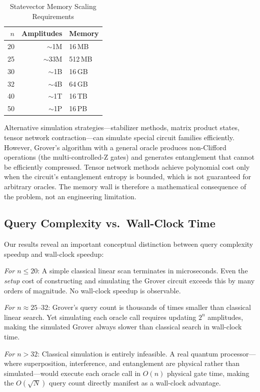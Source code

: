 \documentclass[sigconf, authorversion, nonacm]{acmart}
\begin{document}
\begin{table}[htbp]
\centering
\caption{Statevector Memory Scaling Requirements}
\label{tab:memory_wall}
\begin{tabular}{rrl}
\toprule
$n$ & Amplitudes & Memory \\
\midrule
20 & $\sim$1M  & 16\,MB \\
25 & $\sim$33M & 512\,MB \\
30 & $\sim$1B  & 16\,GB \\
32 & $\sim$4B  & 64\,GB \\
40 & $\sim$1T  & 16\,TB \\
50 & $\sim$1P  & 16\,PB \\
\bottomrule
\end{tabular}
\end{table}

Alternative simulation strategies---stabilizer methods, matrix product states, tensor network contraction---can simulate special circuit families efficiently. However, Grover's algorithm with a general oracle produces non-Clifford operations (the multi-controlled-Z gates) and generates entanglement that cannot be efficiently compressed. Tensor network methods achieve polynomial cost only when the circuit's entanglement entropy is bounded, which is not guaranteed for arbitrary oracles. The memory wall is therefore a mathematical consequence of the problem, not an engineering limitation.

\subsection{Query Complexity vs.\ Wall-Clock Time}

Our results reveal an important conceptual distinction between query complexity speedup and wall-clock speedup:

\textit{For $n \leq 20$}: A simple classical linear scan terminates in microseconds. Even the \emph{setup} cost of constructing and simulating the Grover circuit exceeds this by many orders of magnitude. No wall-clock speedup is observable.

\textit{For $n \approx 25$--$32$}: Grover's query count is thousands of times smaller than classical linear search. Yet simulating each oracle call requires updating $2^n$ amplitudes, making the simulated Grover always slower than classical search in wall-clock time.

\textit{For $n > 32$}: Classical simulation is entirely infeasible. A real quantum processor---where superposition, interference, and entanglement are physical rather than simulated---would execute each oracle call in $O(n)$ physical gate time, making the $O(\sqrt{N})$ query count directly manifest as a wall-clock advantage.
\end{document}
